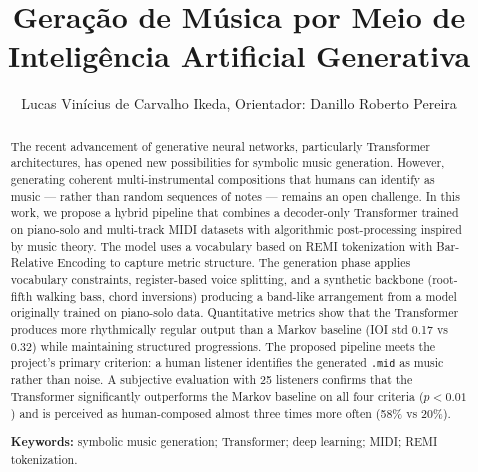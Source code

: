 \documentclass[12pt]{article}
\title{Geração de Música por Meio de Inteligência Artificial Generativa}
\author{Lucas Vinícius de Carvalho Ikeda\inst{1}, Orientador: Danillo Roberto Pereira\inst{1}}
\begin{document}
\maketitle

\begin{abstract}
The recent advancement of generative neural networks, particularly Transformer
architectures, has opened new possibilities for symbolic music generation.
However, generating coherent multi-instrumental compositions that humans can
identify as music --- rather than random sequences of notes --- remains an open
challenge. In this work, we propose a hybrid pipeline that combines a
decoder-only Transformer trained on piano-solo and multi-track MIDI datasets
with algorithmic post-processing inspired by music theory. The model uses a
vocabulary based on REMI tokenization with Bar-Relative Encoding to capture
metric structure. The generation phase applies vocabulary constraints,
register-based voice splitting, and a synthetic backbone (root-fifth walking
bass, chord inversions) producing a band-like arrangement from a model
originally trained on piano-solo data. Quantitative metrics show that the
Transformer produces more rhythmically regular output than a Markov baseline
(IOI std 0.17 vs 0.32) while maintaining structured progressions. The proposed
pipeline meets the project's primary criterion: a human listener identifies the
generated \texttt{.mid} as music rather than noise. A subjective evaluation with
25 listeners confirms that the Transformer significantly outperforms the Markov
baseline on all four criteria ($p < 0.01$) and is perceived as human-composed
almost three times more often (58\% vs 20\%).

\textbf{Keywords:} symbolic music generation; Transformer; deep learning; MIDI;
REMI tokenization.
\end{abstract}
\end{document}
